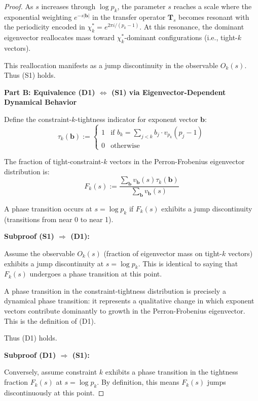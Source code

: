 \begin{proof}
As $s$ increases through $\log p_k$, the parameter $s$ reaches a scale where the exponential weighting $e^{-s|\mathbf{b}|}$ in the transfer operator $\mathbf{T}_s$ becomes resonant with the periodicity encoded in $\chi^*_k = e^{2\pi i/(p_k-1)}$. At this resonance, the dominant eigenvector reallocates mass toward $\chi^*_k$-dominant configurations (i.e., tight-$k$ vectors).

This reallocation manifests as a jump discontinuity in the observable $O_k(s)$. Thus (S1) holds.

\noindent \textbf{Part B: Equivalence (D1) $\Leftrightarrow$ (S1) via Eigenvector-Dependent Dynamical Behavior}

Define the constraint-$k$-tightness indicator for exponent vector $\mathbf{b}$:
\begin{equation}
\tau_k(\mathbf{b}) := \begin{cases} 1 & \text{if } b_k = \sum_{j < k} b_j \cdot v_{p_k}(p_j-1) \\ 0 & \text{otherwise} \end{cases}
\end{equation}

The fraction of tight-constraint-$k$ vectors in the Perron-Frobenius eigenvector distribution is:
\begin{equation}
F_k(s) := \frac{\sum_{\mathbf{b}} v_{\mathbf{b}}(s) \tau_k(\mathbf{b})}{\sum_{\mathbf{b}} v_{\mathbf{b}}(s)}
\end{equation}

A phase transition occurs at $s = \log p_k$ if $F_k(s)$ exhibits a jump discontinuity (transitions from near 0 to near 1).

\noindent \textbf{Subproof (S1) $\Rightarrow$ (D1):}

Assume the observable $O_k(s)$ (fraction of eigenvector mass on tight-$k$ vectors) exhibits a jump discontinuity at $s = \log p_k$. This is identical to saying that $F_k(s)$ undergoes a phase transition at this point.

A phase transition in the constraint-tightness distribution is precisely a dynamical phase transition: it represents a qualitative change in which exponent vectors contribute dominantly to growth in the Perron-Frobenius eigenvector. This is the definition of (D1).

Thus (D1) holds.

\noindent \textbf{Subproof (D1) $\Rightarrow$ (S1):}

Conversely, assume constraint $k$ exhibits a phase transition in the tightness fraction $F_k(s)$ at $s = \log p_k$. By definition, this means $F_k(s)$ jumps discontinuously at this point.


\end{proof}
